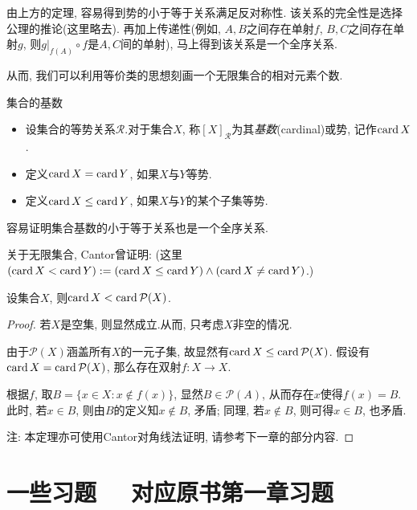 由上方的定理, 容易得到势的小于等于关系满足反对称性. 该关系的完全性是选择公理的推论(这里略去). 再加上传递性(例如, $A, B$之间存在单射$f$, $B, C$之间存在单射$g$, 则$g|_{f(A)} \circ f$是$A, C$间的单射), 马上得到该关系是一个全序关系. 

从而, 我们可以利用等价类的思想刻画一个无限集合的相对元素个数.

\begin{definition}{集合的基数}
	\vspace{-2em}
	\begin{itemize}
		\item 设集合的等势关系$\mathcal{R}$.对于集合$X$, 称$[X]_{\mathcal{R}}$为其\textit{基数}(cardinal)或势, 记作$\operatorname{card} X$.
		\item 定义$\operatorname{card} X = \operatorname{card} Y$, 如果$X$与$Y$等势.
		\item 定义$\operatorname{card} X \leq \operatorname{card} Y$, 如果$X$与$Y$的某个子集等势.
	\end{itemize}
\end{definition}

容易证明集合基数的小于等于关系也是一个全序关系.

关于无限集合, Cantor曾证明: (这里$(\operatorname{card} X < \operatorname{card} Y): = (\operatorname{card} X \leq \operatorname{card} Y) \wedge (\operatorname{card} X \neq \operatorname{card} Y)$.)

\begin{theorem}{}
	设集合$X$, 则$\operatorname{card} X < \operatorname{card} \mathcal{P}(X)$.
\end{theorem}
\begin{proof}
	若$X$是空集, 则显然成立.从而, 只考虑$X$非空的情况. 
	
	由于$\mathcal{P}(X)$涵盖所有$X$的一元子集, 故显然有$\operatorname{card} X \leq \operatorname{card} \mathcal{P}(X)$. 假设有$\operatorname{card} X = \operatorname{card} \mathcal{P}(X)$, 那么存在双射$f: X \to X$. 
	
	根据$f$, 取$B=\{ x \in X: x \notin f(x) \}$, 显然$B \in \mathcal{P}(A)$, 从而存在$x$使得$f(x)=B$. 此时, 若$x \in B$, 则由$B$的定义知$x \notin B$, 矛盾; 同理, 若$x \notin B$, 则可得$x \in B$, 也矛盾. 
	
	注: 本定理亦可使用Cantor对角线法证明, 请参考下一章的部分内容. 
\end{proof}

\newpage
\section*{一些习题 ~~\small 对应原书第一章习题}

